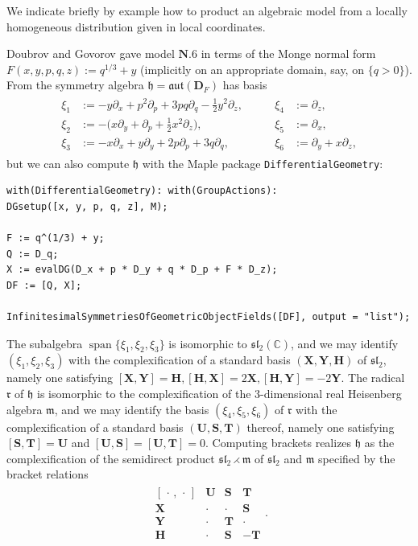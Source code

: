 \documentclass[10pt,a4paper]{amsart}
\DeclareMathOperator{\spanOperator}{span}
\newcommand{\Span}[1]{\spanOperator\{{#1}\}}
\newcommand{\bbC}{\mathbb{C}}
\newcommand{\mbD}{\mathbf{D}}
\newcommand{\mbH}{\mathbf{H}}
\newcommand{\mbS}{\mathbf{S}}
\newcommand{\mbT}{\mathbf{T}}
\newcommand{\mbU}{\mathbf{U}}
\newcommand{\mbX}{\mathbf{X}}
\newcommand{\mbY}{\mathbf{Y}}
\newcommand{\mfh} {\mathfrak{h}}
\newcommand{\mfm} {\mathfrak{m}}
\newcommand{\mfr} {\mathfrak{r}}
\newcommand{\mfaut}{\mathfrak{aut}}
\newcommand{\mfsl} {\mathfrak{sl}}
\numberwithin{equation}{section}
\begin{document}
\begin{Example}\label{example:coordinates-to-distribution}
We indicate briefly by example how to product an algebraic model from a locally homogeneous distribution given in local coordinates.

Doubrov and Govorov gave model $\mathbf{N.6}$ in terms of the Monge normal form $F(x, y, p, q, z) := q^{1 / 3} + y$ (implicitly on an appropriate domain, say, on $\{q > 0\}$). From \cite{DoubrovGovorovCounterexample} the symmetry algebra $\mfh = \mfaut(\mbD_F)$ has basis
\begin{gather}
\begin{alignedat}{4}\label{equation:N.6-symmetries}
	\xi_1 &:= -y \partial_x + p^2 \partial_p + 3 p q \partial_q - \tfrac{1}{2} y^2 \partial_z , \qquad &
	\xi_4 &:= \partial_z , \\
	\xi_2 &:= -\big(x \partial_y + \partial_p + \tfrac{1}{2} x^2 \partial_z\big) , \qquad &
	\xi_5 &:= \partial_x , \\
	\xi_3 &:= -x \partial_x + y \partial_y + 2 p \partial_p + 3 q \partial_q , \qquad &
	\xi_6 &:= \partial_y + x \partial_z ,
\end{alignedat}
\end{gather}
but we can also compute $\mfh$ with the Maple package \texttt{DifferentialGeometry}:

\begin{Verbatim}[frame = single, xleftmargin=0.8cm, xrightmargin=0.8cm]
with(DifferentialGeometry): with(GroupActions):
DGsetup([x, y, p, q, z], M);

F := q^(1/3) + y;
Q := D_q;
X := evalDG(D_x + p * D_y + q * D_p + F * D_z);
DF := [Q, X];

InfinitesimalSymmetriesOfGeometricObjectFields([DF], output = "list");
\end{Verbatim}

The subalgebra $\Span{\xi_1, \xi_2, \xi_3}$ is isomorphic to $\mfsl_2(\bbC)$, and we may identify $(\xi_1, \xi_2, \xi_3)$ with the complexification of a standard basis $(\mbX, \mbY, \mbH)$ of $\mfsl_2$, namely one satisfying $[\mbX, \mbY] = \mbH, [\mbH, \mbX] = 2 \mbX, [\mbH, \mbY] = -2 \mbY$. The radical $\mfr$ of $\mfh$ is isomorphic to the complexification of the $3$-dimensional real Heisenberg algebra $\mfm$, and we may identify the basis $(\xi_4, \xi_5, \xi_6)$ of $\mfr$ with the complexification of a standard basis $(\mbU, \mbS, \mbT)$ thereof, namely one satisfying $[\mbS, \mbT] = \mbU$ and $[\mbU, \mbS] = [\mbU, \mbT] = 0$. Computing brackets realizes $\mfh$ as the complexification of the semidirect product $\mfsl_2 \rightthreetimes \mfm$ of $\mfsl_2$ and $\mfm$ specified by the bracket relations
\begin{gather*}
	\begin{array}{c|ccc}
		[\,\cdot\,,\,\cdot\,] & \mbU & \mbS &\mbT \\
		\hline
		\mbX & \cdot & \cdot & \mbS \\
		\mbY & \cdot & \mbT & \cdot \\
		\mbH & \cdot & \mbS & -\mbT
	\end{array} .
\end{gather*}


\end{Example}
\end{document}
